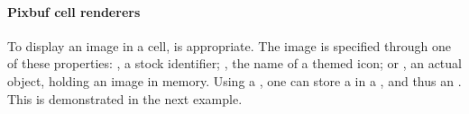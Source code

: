 \paragraph{Pixbuf cell renderers}

To display an image in a cell,  is
appropriate. The image is specified through one of these properties:
, a stock identifier; , the name of a
themed icon; or , an actual  object,
holding an image in memory. Using a , one can store a
 in a , and thus an
. This is demonstrated in the next example.



